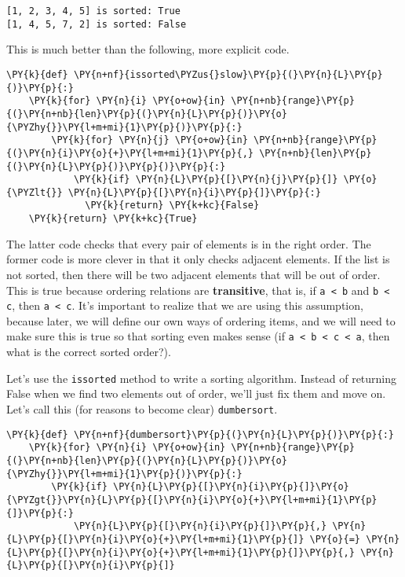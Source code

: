 \begin{Verbatim}
[1, 2, 3, 4, 5] is sorted: True
[1, 4, 5, 7, 2] is sorted: False

\end{Verbatim}


This is much better than the following, more explicit code.

\begin{Verbatim}[commandchars=\\\{\}]
\PY{k}{def} \PY{n+nf}{issorted\PYZus{}slow}\PY{p}{(}\PY{n}{L}\PY{p}{)}\PY{p}{:}
    \PY{k}{for} \PY{n}{i} \PY{o+ow}{in} \PY{n+nb}{range}\PY{p}{(}\PY{n+nb}{len}\PY{p}{(}\PY{n}{L}\PY{p}{)}\PY{o}{\PYZhy{}}\PY{l+m+mi}{1}\PY{p}{)}\PY{p}{:}
        \PY{k}{for} \PY{n}{j} \PY{o+ow}{in} \PY{n+nb}{range}\PY{p}{(}\PY{n}{i}\PY{o}{+}\PY{l+m+mi}{1}\PY{p}{,} \PY{n+nb}{len}\PY{p}{(}\PY{n}{L}\PY{p}{)}\PY{p}{)}\PY{p}{:}
            \PY{k}{if} \PY{n}{L}\PY{p}{[}\PY{n}{j}\PY{p}{]} \PY{o}{\PYZlt{}} \PY{n}{L}\PY{p}{[}\PY{n}{i}\PY{p}{]}\PY{p}{:}
              \PY{k}{return} \PY{k+kc}{False}
    \PY{k}{return} \PY{k+kc}{True}
\end{Verbatim}



The latter code checks that every pair of elements is in the right order.
The former code is more clever in that it only checks adjacent elements.
If the list is not sorted, then there will be two adjacent elements that will be out of order.
This is true because ordering relations are \textbf{transitive}, that is, if \texttt{a < b} and \texttt{b < c}, then \texttt{a < c}.
It's important to realize that we are using this assumption, because later, we will define our own ways of ordering items, and we will need to make sure this is true so that sorting even makes sense (if \texttt{a < b < c < a}, then what is the correct sorted order?).


Let's use the \texttt{issorted} method to write a sorting algorithm.
Instead of returning False when we find two elements out of order, we'll just fix them and move on.  Let's call this (for reasons to become clear) \texttt{dumbersort}.

\begin{Verbatim}[commandchars=\\\{\}]
\PY{k}{def} \PY{n+nf}{dumbersort}\PY{p}{(}\PY{n}{L}\PY{p}{)}\PY{p}{:}
    \PY{k}{for} \PY{n}{i} \PY{o+ow}{in} \PY{n+nb}{range}\PY{p}{(}\PY{n+nb}{len}\PY{p}{(}\PY{n}{L}\PY{p}{)}\PY{o}{\PYZhy{}}\PY{l+m+mi}{1}\PY{p}{)}\PY{p}{:}
        \PY{k}{if} \PY{n}{L}\PY{p}{[}\PY{n}{i}\PY{p}{]}\PY{o}{\PYZgt{}}\PY{n}{L}\PY{p}{[}\PY{n}{i}\PY{o}{+}\PY{l+m+mi}{1}\PY{p}{]}\PY{p}{:}
            \PY{n}{L}\PY{p}{[}\PY{n}{i}\PY{p}{]}\PY{p}{,} \PY{n}{L}\PY{p}{[}\PY{n}{i}\PY{o}{+}\PY{l+m+mi}{1}\PY{p}{]} \PY{o}{=} \PY{n}{L}\PY{p}{[}\PY{n}{i}\PY{o}{+}\PY{l+m+mi}{1}\PY{p}{]}\PY{p}{,} \PY{n}{L}\PY{p}{[}\PY{n}{i}\PY{p}{]}
\end{Verbatim}



